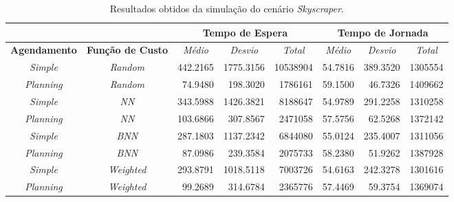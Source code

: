 \begin{table}[htb!]
\centering
\caption{Resultados obtidos da simulação do cenário \textit{Skyscraper}.}
\label{tab:results:skyscraper}
\begin{tabular}{|c|c|r|r|r|r|r|r|}
\hline
\multicolumn{2}{|c|}{\textbf{}}                 & \multicolumn{3}{c|}{\textbf{Tempo de Espera}}                                                                    & \multicolumn{3}{c|}{\textbf{Tempo de Jornada}}                                                                                                                       \\ \hline
\textbf{Agendamento} & \textbf{Função de Custo} & \multicolumn{1}{c|}{\textit{Médio}} & \multicolumn{1}{c|}{\textit{Desvio}} & \multicolumn{1}{c|}{\textit{Total}} & \multicolumn{1}{c|}{\textit{Médio}}                   & \multicolumn{1}{c|}{\textit{Desvio}}                  & \multicolumn{1}{c|}{\textit{Total}}                  \\ \hline
\textit{Simple}      & \textit{Random}          & 442.2165  & 1775.3156  & 10538904 & 54.7816 & 389.3520 & 1305554 \\ \hline
\textit{Planning}    & \textit{Random}          &  74.9480  &  198.3020  &  1786161 & 59.1500 &  46.7326 & 1409662 \\ \hline
\textit{Simple}      & \textit{NN}              & 343.5988  & 1426.3821  &  8188647 & 54.9789 & 291.2258 & 1310258 \\ \hline
\textit{Planning}    & \textit{NN}              & 103.6866  &  307.8567  &  2471058 & 57.5756 &  62.5268 & 1372142 \\ \hline
\textit{Simple}      & \textit{BNN}             & 287.1803  & 1137.2342  &  6844080 & 55.0124 & 235.4007 & 1311056 \\ \hline
\textit{Planning}    & \textit{BNN}             &  87.0986  &  239.3584  &  2075733 & 58.2380 &  51.9262 & 1387928 \\ \hline
\textit{Simple}      & \textit{Weighted}        & 293.8791  & 1018.5118  &  7003726 & 54.6163 & 242.3278 & 1301616 \\ \hline
\textit{Planning}    & \textit{Weighted}        &  99.2689  &  314.6784  &  2365776 & 57.4469 &  59.3754 & 1369074 \\ \hline
\end{tabular}
\end{table}